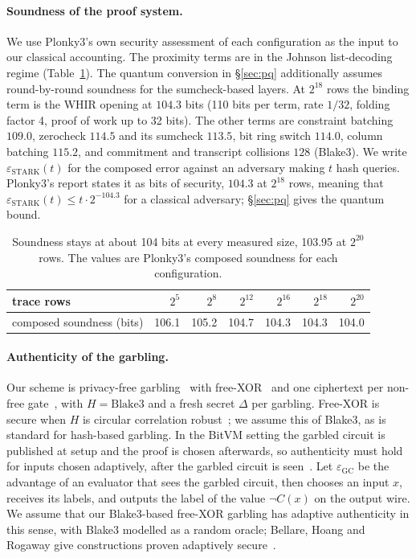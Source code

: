 \documentclass[11pt]{article}
\newcommand{\blake}{\mathrm{Blake3}}
\begin{document}
\paragraph{Soundness of the proof system.} We use Plonky3's own security
assessment of each configuration as the input to our classical accounting. The
proximity terms are in the Johnson list-decoding regime
(Table~\ref{tab:security}). The quantum conversion in \S\ref{sec:pq}
additionally assumes round-by-round soundness for the sumcheck-based layers.
At $2^{18}$ rows the binding term is the WHIR opening at $104.3$ bits (110 bits per
term, rate $1/32$, folding factor 4, proof of work up to 32 bits). The other terms
are constraint batching $109.0$, zerocheck $114.5$ and its sumcheck $113.5$, bit
ring switch $114.0$, column batching $115.2$, and commitment and transcript
collisions $128$ (Blake3). We write $\varepsilon_{\mathrm{STARK}}(t)$ for the
composed error against an adversary making $t$ hash queries. Plonky3's report
states it as bits of security, $104.3$ at $2^{18}$ rows, meaning that
$\varepsilon_{\mathrm{STARK}}(t)\le t\cdot2^{-104.3}$ for a classical adversary; \S\ref{sec:pq} gives the quantum bound.

\begin{table}[t]\centering\small
\begin{tabular}{lrrrrrr}\toprule
trace rows & $2^5$ & $2^8$ & $2^{12}$ & $2^{16}$ & $2^{18}$ & $2^{20}$\\\midrule
composed soundness (bits) & 106.1 & 105.2 & 104.7 & 104.3 & 104.3 & 104.0\\\bottomrule
\end{tabular}
\caption{Soundness stays at about 104 bits at every measured size, 103.95 at $2^{20}$ rows. The values are
Plonky3's composed soundness for each configuration.}
\label{tab:security}
\end{table}

\paragraph{Authenticity of the garbling.} Our scheme is privacy-free
garbling~\cite{fno15privacyfree} with free-XOR~\cite{ks08} and one ciphertext per
non-free gate~\cite{zre15}, with $H=\blake$ and a fresh secret $\Delta$ per
garbling. Free-XOR is secure when $H$ is circular correlation
robust~\cite{ckkz12freexor}; we assume this of Blake3, as is standard for
hash-based garbling. In the BitVM setting the garbled circuit is published at
setup and the proof is chosen afterwards, so authenticity must hold for inputs
chosen adaptively, after the garbled circuit is seen~\cite{bhr12adaptive}. Let
$\varepsilon_{\mathrm{GC}}$ be the advantage of an evaluator that sees the garbled
circuit, then chooses an input $x$, receives its labels, and outputs the label of
the value $\neg C(x)$ on the output wire. We assume that our Blake3-based
free-XOR garbling has adaptive authenticity in this sense, with Blake3 modelled as
a random oracle; Bellare, Hoang and Rogaway give constructions proven adaptively
secure~\cite{bhr12adaptive}.
\end{document}
